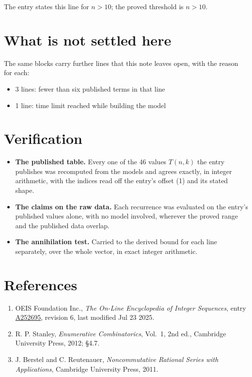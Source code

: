 \documentclass[11pt]{article}
\theoremstyle{definition}
\begin{document}
The entry states this line for $n > 10$; the proved threshold is $n > 10$.

\section{What is not settled here}

The same blocks carry further lines that this note leaves open, with the reason for each:

\begin{itemize}

\item 3 lines: fewer than six published terms in that line

\item 1 line: time limit reached while building the model

\end{itemize}

\section{Verification}

\begin{itemize}

\item {\bfseries The published table.} Every one of the 46 values $T(n,k)$ the entry publishes was recomputed from the models and agrees exactly, in integer arithmetic, with the indices read off the entry's offset (1) and its stated shape.

\item {\bfseries The claims on the raw data.} Each recurrence was evaluated on the entry's published values alone, with no model involved, wherever the proved range and the published data overlap.

\item {\bfseries The annihilation test.} Carried to the derived bound for each line separately, over the whole vector, in exact integer arithmetic.

\end{itemize}

\section{References}

\begin{enumerate}

\item OEIS Foundation Inc., \emph{The On-Line Encyclopedia of Integer Sequences}, entry \href{https://oeis.org/A252695}{A252695}, revision 6, last modified Jul 23 2025.

\item R. P. Stanley, \emph{Enumerative Combinatorics}, Vol.~1, 2nd ed., Cambridge University Press, 2012; \S4.7.

\item J. Berstel and C. Reutenauer, \emph{Noncommutative Rational Series with Applications}, Cambridge University Press, 2011.

\end{enumerate}
\end{document}
